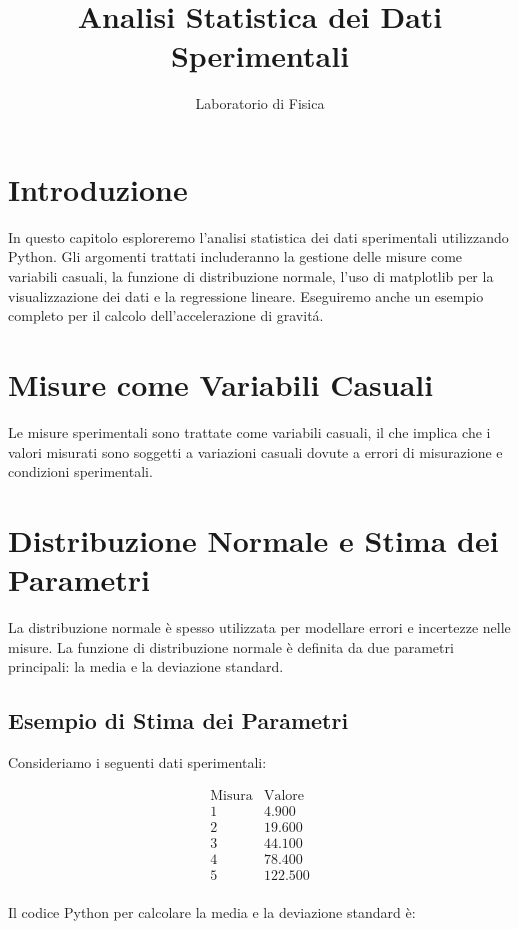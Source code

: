 \documentclass[a4paper,12pt]{article}
\title{Analisi Statistica dei Dati Sperimentali}
\author{Laboratorio di Fisica}
\date{}
\begin{document}
\maketitle
\tableofcontents
\section{Introduzione}
In questo capitolo esploreremo l'analisi statistica dei dati sperimentali utilizzando Python. Gli argomenti trattati includeranno la gestione delle misure come variabili casuali, la funzione di distribuzione normale, l'uso di matplotlib per la visualizzazione dei dati e la regressione lineare. Eseguiremo anche un esempio completo per il calcolo dell'accelerazione di gravit\'a.

\section{Misure come Variabili Casuali}
Le misure sperimentali sono trattate come variabili casuali, il che implica che i valori misurati sono soggetti a variazioni casuali dovute a errori di misurazione e condizioni sperimentali.

\section{Distribuzione Normale e Stima dei Parametri}

La distribuzione normale è spesso utilizzata per modellare errori e incertezze nelle misure. La funzione di distribuzione normale è definita da due parametri principali: la media e la deviazione standard.

\subsection{Esempio di Stima dei Parametri}

Consideriamo i seguenti dati sperimentali:

\[
\begin{array}{c|c}
\text{Misura} & \text{Valore} \\
\hline
1 & 4.900 \\
2 & 19.600 \\
3 & 44.100 \\
4 & 78.400 \\
5 & 122.500 \\
\end{array}
\]

Il codice Python per calcolare la media e la deviazione standard è:
\end{document}
